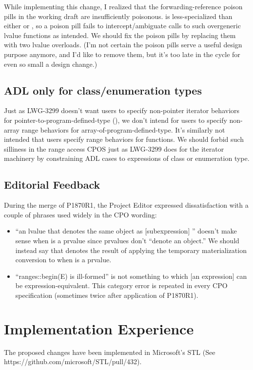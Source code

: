 While implementing this change,
I realized that the forwarding-reference poison pills in the working draft
are insufficiently poisonous.
 is less-specialized than either
 or ,
so a  poison pill fails to intercept/ambiguate
calls to such overgeneric lvalue functions as intended.
We should fix the poison pills by replacing them with two lvalue overloads.
(I'm not certain the poison pills serve a useful design purpose anymore,
and I'd like to remove them,
but it's too late in the cycle for even so small a design change.)


\section{ADL only for class/enumeration types}

Just as LWG-3299 doesn't want users to specify non-pointer iterator behaviors
for pointer-to-program-defined-type (\cite{lwg3299}),
we don't intend for users to specify
non-array range behaviors for array-of-program-defined-type.
It's similarly not intended that users specify range behaviors for functions.
We should forbid such silliness in the range access CPOS
just as LWG-3299 does for the iterator machinery
by constraining ADL cases to expressions of class or enumeration type.


\section{Editorial Feedback}
During the merge of P1870R1, the Project Editor expressed dissatisfaction
with a couple of phrases used widely in the CPO wording:
\begin{itemize}
\item ``an lvalue  that denotes the same object as [subexpression] ''
  doesn't make sense when  is a prvalue since prvalues don't ``denote an object.''
  We should instead say that  denotes the result of applying
  the temporary materialization conversion to  when  is a prvalue.
\item ``ranges::begin(E) is ill-formed'' is not something
  to which [an expression] can be expression-equivalent.
  This category error is repeated in every CPO specification
  (sometimes twice after application of P1870R1).
\end{itemize}


\chapter{Implementation Experience}
The proposed changes have been implemented in Microsoft's STL (See https://github.com/microsoft/STL/pull/432).


